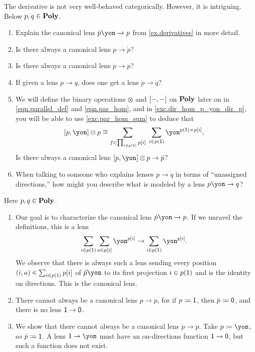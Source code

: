 \documentclass[Book-Poly]{subfiles}
\begin{document}
\begin{exercise}
The derivative is not very well-behaved categorically.
However, it is intriguing.
Below $p, q \in \mathbf{Poly}$.
\begin{enumerate}
	\item Explain the canonical lens $\dot{p}\yon\to p$ from \cref{ex.derivatives} in more detail.
	\item Is there always a canonical lens $p\to \dot{p}$?
	\item Is there always a canonical lens $\dot{p}\to p$?
	\item If given a lens $p\to q$, does one get a lens $\dot{p}\to\dot{q}$?
	\item We will define the binary operations $\otimes$ and $[-,-]$ on $\mathbf{Poly}$ later on in \eqref{eqn.parallel_def} and \eqref{eqn.par_hom}, and in \cref{exc.dir_hom_p_yon_dir_p}, you will be able to use \cref{exc.par_hom_sum} to deduce that
	\begin{equation} \label{eqn.dir_hom_p_yon_dir_p}
	    \ihom{p, \yon} \otimes p \iso \sum_{f \in \prod_{i \in p(\1)} p[i]} \; \sum_{i \in p(\1)} \yon^{p(\1) \times p[i]},
	\end{equation}
	Is there always a canonical lens $\ihom{p,\yon}\otimes p\to \dot{p}$?
	\item When talking to someone who explains lenses $p\to\dot{q}$ in terms of ``unassigned directions,'' how might you describe what is modeled by a lens $p\yon\to q$?
	\qedhere
\end{enumerate}
\begin{solution}
Here $p, q \in \mathbf{Poly}$.
\begin{enumerate}
	\item Our goal is to characterize the canonical lens $\dot{p}\yon\to p$.
	If we unravel the definitions, this is a lens
	\[
	    \sum_{i \in p(\1)} \sum_{a \in p[i]} \yon^{p[i]} \to \sum_{i \in p(\1)} \yon^{p[i]}.
	\]
	We observe that there is always such a lens sending every position $(i, a) \in \sum_{i \in p(\textsf{1})} p[i]$ of $\dot{p}\yon$ to its first projection $i \in p(\textsf{1})$ and is the identity on directions.
	This is the canonical lens.

	\item There cannot always be a canonical lens $p\to \dot{p}$, for if $p \coloneqq \textsf{1}$, then $\dot{p} \coloneqq \textsf{0}$, and there is no lens $\textsf{1} \to \textsf{0}$.

	\item We show that there cannot always be a canonical lens $\dot{p}\to p$.
	Take $p \coloneqq \yon$, so $\dot{p} \coloneqq \textsf{1}$.
	A lens $\1 \to \yon$ must have an on-directions function $\textsf{1} \to \textsf{0}$, but such a function does not exist.


\end{enumerate}
\end{solution}
\end{exercise}
\end{document}
